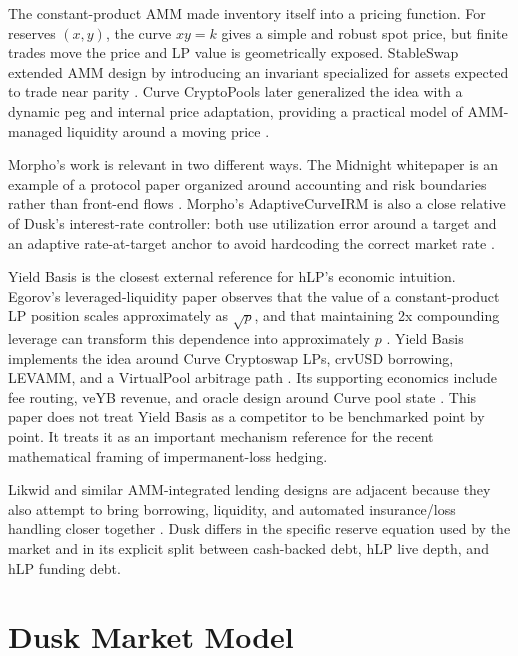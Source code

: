 \documentclass[11pt]{article}
\begin{document}
The constant-product AMM made inventory itself into a pricing function. For reserves $(x,y)$, the curve $xy=k$ gives a simple and robust spot price, but finite trades move the price and LP value is geometrically exposed. StableSwap extended AMM design by introducing an invariant specialized for assets expected to trade near parity \cite{curve-stableswap}. Curve CryptoPools later generalized the idea with a dynamic peg and internal price adaptation, providing a practical model of AMM-managed liquidity around a moving price \cite{curve-cryptopools}.

Morpho's work is relevant in two different ways. The Midnight whitepaper is an example of a protocol paper organized around accounting and risk boundaries rather than front-end flows \cite{morpho-midnight}. Morpho's AdaptiveCurveIRM is also a close relative of Dusk's interest-rate controller: both use utilization error around a target and an adaptive rate-at-target anchor to avoid hardcoding the correct market rate \cite{morpho-irm,morpho-irm-github}.

Yield Basis is the closest external reference for hLP's economic intuition. Egorov's leveraged-liquidity paper observes that the value of a constant-product LP position scales approximately as $\sqrt p$, and that maintaining 2x compounding leverage can transform this dependence into approximately $p$ \cite{egorov-yieldbasis-whitepaper}. Yield Basis implements the idea around Curve Cryptoswap LPs, crvUSD borrowing, LEVAMM, and a VirtualPool arbitrage path \cite{yieldbasis-how,yieldbasis-technical,yieldbasis-governance}. Its supporting economics include fee routing, veYB revenue, and oracle design around Curve pool state \cite{yieldbasis-fees,yieldbasis-oracle}. This paper does not treat Yield Basis as a competitor to be benchmarked point by point. It treats it as an important mechanism reference for the recent mathematical framing of impermanent-loss hedging.

Likwid and similar AMM-integrated lending designs are adjacent because they also attempt to bring borrowing, liquidity, and automated insurance/loss handling closer together \cite{likwid-framework}. Dusk differs in the specific reserve equation used by the market and in its explicit split between cash-backed debt, hLP live depth, and hLP funding debt.

\section{Dusk Market Model}
\end{document}
